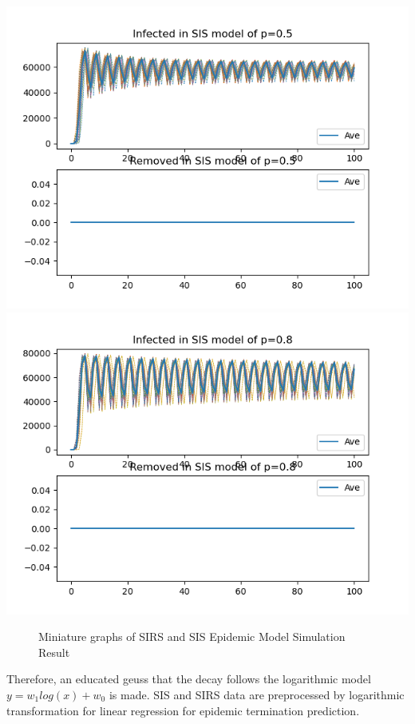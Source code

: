 \documentclass{subfile}
\begin{document}
\begin{center}
    \includegraphics[scale=0.4]{sisp05r1i3s3}
    \includegraphics[scale=0.4]{sisp08r1i3s3}\\
  \end{center}
  \begin{figure}[h!]
  \centering
    \caption{Miniature graphs of SIRS and SIS Epidemic Model Simulation Result}
  \end{figure}

  Therefore, an educated geuss that the decay follows the logarithmic model \(y=w_1 log(x) + w_0\) is made. SIS and SIRS data are preprocessed by logarithmic transformation for linear regression for epidemic termination prediction.
\end{document}
